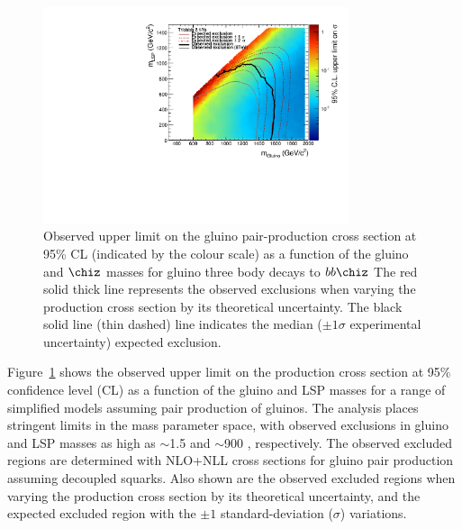 \begin{figure}[tbhp]

  \begin{center}
    \includegraphics[width=0.8\textwidth]{xs_contour_withHisto.pdf}
    \caption{Observed upper limit on the gluino pair-production cross section at 95\% CL (indicated by the colour scale) as a function of the gluino
      and $\chiz$ masses for gluino three body decays to $bb\chiz$
      The red solid thick line represents the observed exclusions when
      varying the production cross section by its theoretical uncertainty. 
      The black solid line (thin dashed) line indicates the median (${\pm}1 \sigma$ 
      experimental uncertainty) expected exclusion.
      \label{fig:limits-sms} }
  \end{center}
\end{figure}


Figure~\ref{fig:limits-sms} shows the observed upper limit on the
production cross section at 95\% confidence level (CL) as a function
of the gluino and LSP masses for
a range of simplified models assuming pair production of gluinos. 
The analysis places stringent limits in the mass parameter space, with observed exclusions in gluino and LSP masses as high as $\sim$1.5 \TeV and $\sim$900 \GeV, respectively.
The observed excluded regions are determined with NLO+NLL
cross sections for gluino pair production assuming decoupled squarks. Also shown are the
observed excluded regions when varying the production cross section by
its theoretical uncertainty, and the expected excluded region 
with the ${\pm}1$ standard-deviation ($\sigma$) variations. 

